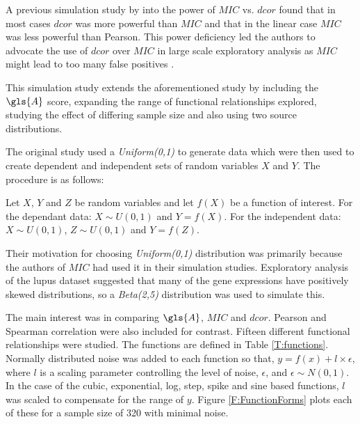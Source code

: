 \documentclass[a4paper, 12pt]{report}
\begin{document}
A previous simulation study by \citet{Tibshirani2011} into the power of $MIC$ vs. $dcor$ found that in most cases $dcor$ was more powerful than $MIC$ and that in the linear case $MIC$ was less powerful than \gls{Pearson}. This power deficiency led the authors to advocate the use of $dcor$ over $MIC$ in large scale exploratory analysis as $MIC$ might lead to too many false positives \cite{Tibshirani2011}. 

This simulation study extends the aforementioned study by including the $\gls{A}$ score, expanding the range of functional relationships explored, studying the effect of differing sample size and also using two source distributions. 

The original study used a \textit{Uniform(0,1)} to generate data which were then used to create dependent and independent sets of random variables $X$ and $Y$. The procedure is as follows: 

Let $X$, $Y$ and $Z$ be random variables and let $f(X)$ be a function of interest. For the dependant data: $X\sim U(0,1)$ and $Y = f(X)$. For the independent data: $X\sim U(0,1)$, $Z\sim U(0,1)$  and $Y = f(Z)$.


Their motivation for choosing \textit{Uniform(0,1)} distribution was primarily because the authors of $MIC$ had used it in their simulation studies\cite{Tibshirani2011, mic2011}. Exploratory analysis of the lupus dataset suggested that many of the gene expressions have positively skewed distributions, so a \textit{Beta(2,5)} distribution was used to simulate this. 

The main interest was in comparing $\gls{A}$, $MIC$ and $dcor$.  Pearson and Spearman correlation were also included for contrast. Fifteen different functional relationships were studied. The functions are defined in Table \ref{T:functions}. Normally distributed noise was added to each function so that, $y = f(x) + l \times \epsilon$, where $l$ is a scaling parameter controlling the level of noise, $\epsilon$, and $\epsilon \sim N(0, 1)$. In the case of the cubic, exponential, log, step, spike and sine based functions, $l$ was scaled to compensate for the range of $y$. Figure \ref{F:FunctionForms} plots each of these for a sample size of 320 with minimal noise.

\end{document}
